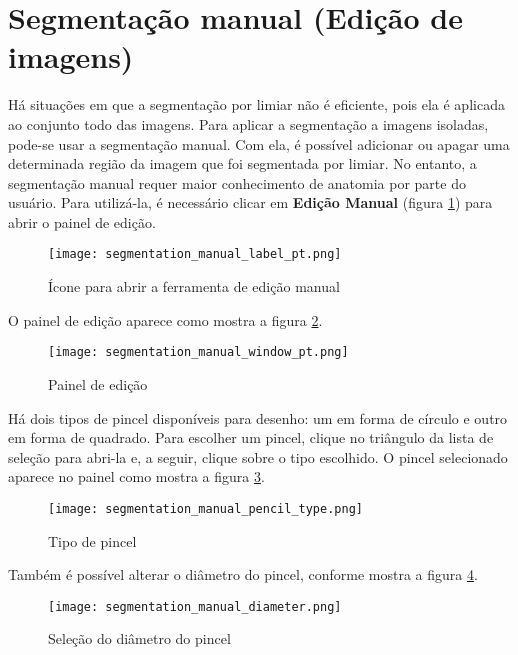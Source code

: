 \section{Segmentação manual (Edição de imagens)}

Há situações em que a segmentação por limiar não é eficiente, pois ela é aplicada ao conjunto
todo das imagens. Para aplicar a segmentação a imagens isoladas, pode-se usar a segmentação
manual. Com ela, é possível adicionar ou apagar uma determinada região da imagem que foi
segmentada por limiar. No entanto, a segmentação manual requer maior conhecimento de anatomia
por parte do usuário. Para utilizá-la, é necessário clicar em \textbf{Edição Manual} (figura \ref{fig:advanced_edition}) para abrir o painel de edição.

\begin{figure}[!htb]
\centering
\texttt{[image: segmentation\_manual\_label\_pt.png]}
\caption{Ícone para abrir a ferramenta de edição manual}
\label{fig:advanced_edition}
\end{figure}

O painel de edição aparece como mostra a figura \ref{fig:edition_slices_ref}.

\begin{figure}[!htb]
\centering
\texttt{[image: segmentation\_manual\_window\_pt.png]}
\caption{Painel de edição}
\label{fig:edition_slices_ref}
\end{figure}

Há dois tipos de pincel disponíveis para desenho: um em forma de círculo e outro em forma
de quadrado. Para escolher um pincel, clique no triângulo da lista de seleção para abri-la
e, a seguir, clique sobre o tipo escolhido. O pincel selecionado aparece no painel como
mostra a figura \ref{fig:brush_type}.

\begin{figure}[!htb]
\centering
\texttt{[image: segmentation\_manual\_pencil\_type.png]}
\caption{Tipo de pincel}
\label{fig:brush_type}
\end{figure}

\newpage

Também é possível alterar o diâmetro do pincel, conforme mostra a figura \ref{fig:select_diameter}.

\begin{figure}[!htb]
\centering
\texttt{[image: segmentation\_manual\_diameter.png]}
\caption{Seleção do diâmetro do pincel}
\label{fig:select_diameter}
\end{figure}

